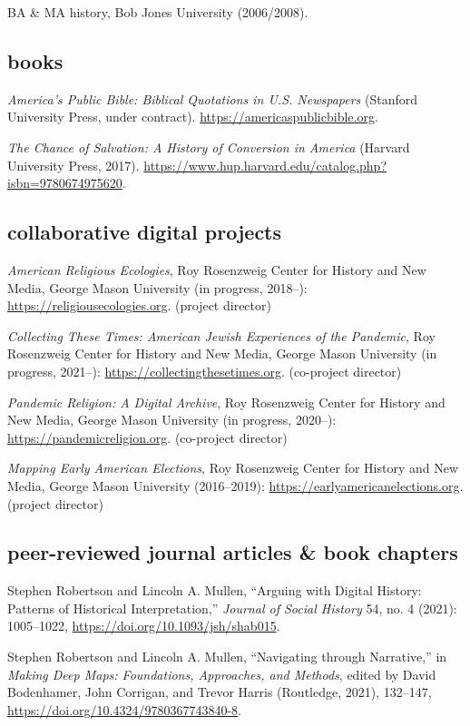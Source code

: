 \documentclass[11pt]{article}
\begin{document}
BA \& MA history, Bob Jones University (2006/2008).

\subsection{books}\label{books}

\emph{America's Public Bible: Biblical Quotations in U.S. Newspapers} (Stanford University Press, under contract). \url{https://americaspublicbible.org}.

\emph{The Chance of Salvation: A History of Conversion in America} (Harvard University Press, 2017). \url{https://www.hup.harvard.edu/catalog.php?isbn=9780674975620}.

\subsection{collaborative digital projects}\label{digital projects}

\emph{American Religious Ecologies}, Roy Rosenzweig Center for History and New Media, George Mason University (in progress, 2018--): \url{https://religiousecologies.org}. (project director)

\emph{Collecting These Times: American Jewish Experiences of the Pandemic}, Roy Rosenzweig Center for History and New Media, George Mason University (in progress, 2021--): \url{https://collectingthesetimes.org}. (co-project director)

\emph{Pandemic Religion: A Digital Archive}, Roy Rosenzweig Center for History and New Media, George Mason University (in progress, 2020--): \url{https://pandemicreligion.org}. (co-project director)

\emph{Mapping Early American Elections}, Roy Rosenzweig Center for History and New Media, George Mason University (2016--2019): \url{https://earlyamericanelections.org}. (project director)

\subsection{peer-reviewed journal articles \& book chapters}\label{peer-reviewed}

Stephen Robertson and Lincoln A. Mullen, ``Arguing with Digital History: 
Patterns of Historical Interpretation,'' \emph{Journal of Social History} 54, 
no. 4 (2021): 1005--1022, \url{https://doi.org/10.1093/jsh/shab015}.

Stephen Robertson and Lincoln A. Mullen, ``Navigating through Narrative,'' in 
\emph{Making Deep Maps: Foundations, Approaches, and Methods}, edited by David 
Bodenhamer, John Corrigan, and Trevor Harris (Routledge, 2021), 132--147, 
\url{https://doi.org/10.4324/9780367743840-8}.
\end{document}
